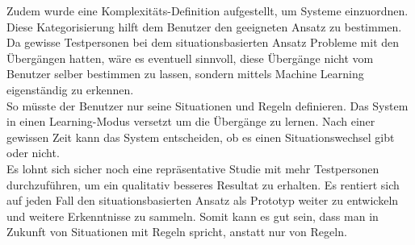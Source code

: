 Zudem wurde eine Komplexitäts-Definition aufgestellt, um Systeme einzuordnen. Diese Kategorisierung hilft dem Benutzer den geeigneten Ansatz zu bestimmen.\\[2ex]
%
Da gewisse Testpersonen bei dem situationsbasierten Ansatz Probleme mit den Übergängen hatten, wäre es eventuell sinnvoll, diese Übergänge nicht vom Benutzer selber bestimmen zu lassen, sondern mittels Machine Learning  eigenständig zu erkennen.\\
So müsste der Benutzer nur seine Situationen und Regeln definieren. Das System in einen Learning-Modus versetzt um die Übergänge zu lernen. Nach einer gewissen Zeit kann das System entscheiden, ob es einen Situationswechsel gibt oder nicht.\\
Es lohnt sich sicher noch eine repräsentative Studie mit mehr Testpersonen durchzuführen, um ein qualitativ besseres Resultat zu erhalten. Es rentiert sich auf jeden Fall den situationsbasierten Ansatz als Prototyp weiter zu entwickeln und weitere Erkenntnisse zu sammeln. Somit kann es gut sein, dass man in Zukunft von Situationen mit Regeln spricht, anstatt nur von Regeln.